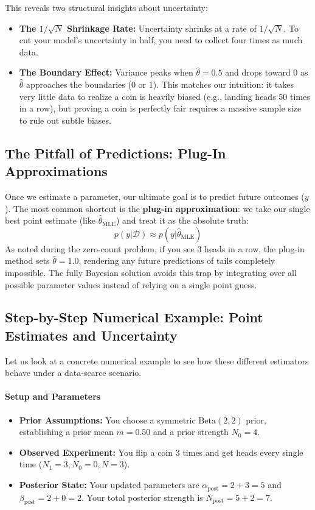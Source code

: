 \documentclass{article}
\begin{document}
This reveals two structural insights about uncertainty:
\begin{itemize}
    \item \textbf{The $1/\sqrt{N}$ Shrinkage Rate:} Uncertainty shrinks at a rate of $1/\sqrt{N}$. To cut your model's uncertainty in half, you need to collect four times as much data.
    \item \textbf{The Boundary Effect:} Variance peaks when $\hat{\theta} = 0.5$ and drops toward $0$ as $\hat{\theta}$ approaches the boundaries ($0$ or $1$). This matches our intuition: it takes very little data to realize a coin is heavily biased (e.g., landing heads $50$ times in a row), but proving a coin is perfectly fair requires a massive sample size to rule out subtle biases.
\end{itemize}

\subsection{The Pitfall of Predictions: Plug-In Approximations}
Once we estimate a parameter, our ultimate goal is to predict future outcomes ($y$). The most common shortcut is the \textbf{plug-in approximation}: we take our single best point estimate (like $\hat{\theta}_{\text{MLE}}$) and treat it as the absolute truth:
\begin{equation}
p(y|\mathcal{D}) \approx p(y|\hat{\theta}_{\text{MLE}})
\end{equation}
As noted during the zero-count problem, if you see $3$ heads in a row, the plug-in method sets $\hat{\theta} = 1.0$, rendering any future predictions of tails completely impossible. The fully Bayesian solution avoids this trap by integrating over all possible parameter values instead of relying on a single point guess.

\subsection{Step-by-Step Numerical Example: Point Estimates and Uncertainty}

Let us look at a concrete numerical example to see how these different estimators behave under a data-scarce scenario.

\paragraph{Setup and Parameters}
\begin{itemize}
    \item \textbf{Prior Assumptions:} You choose a symmetric $\text{Beta}(2,2)$ prior, establishing a prior mean $m = 0.50$ and a prior strength $N_0 = 4$.
    \item \textbf{Observed Experiment:} You flip a coin $3$ times and get heads every single time ($N_1 = 3, N_0 = 0, N = 3$).
    \item \textbf{Posterior State:} Your updated parameters are $\alpha_{\text{post}} = 2 + 3 = 5$ and $\beta_{\text{post}} = 2 + 0 = 2$. Your total posterior strength is $N_{\text{post}} = 5 + 2 = 7$.
\end{itemize}
\end{document}

